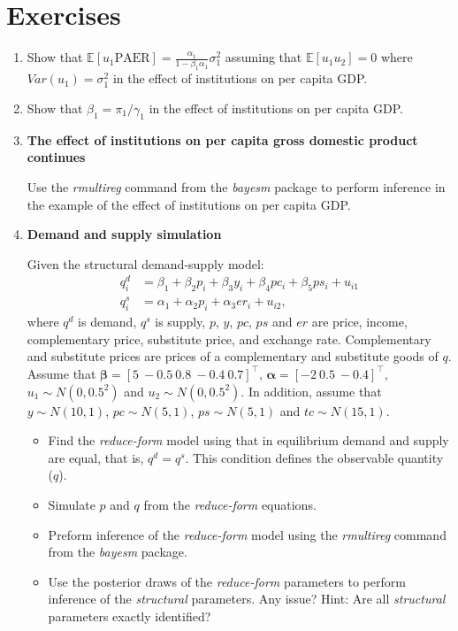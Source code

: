 \section{Exercises}\label{sec76}
\begin{enumerate}
	\item Show that $\mathbb{E}[u_1\text{PAER}]=\frac{\alpha_1}{1-\beta_1\alpha_1}\sigma^2_1$ assuming that $\mathbb{E}[u_1u_2]=0$ where $Var(u_1)=\sigma^2_1$ in the effect of institutions on per capita GDP.
	
	\item Show that $\beta_1=\pi_1/\gamma_1$ in the effect of institutions on per capita GDP.
	
	\item \textbf{The effect of institutions on per capita gross domestic product continues}
	
	Use the \textit{rmultireg} command from the \textit{bayesm} package to perform inference in the example of the effect of institutions on per capita GDP. 
	
	\item \textbf{Demand and supply simulation}
	
	Given the structural demand-supply model:
	\begin{align*}
		q_i^d&=\beta_1+\beta_2p_i+\beta_3y_i+\beta_4pc_i+\beta_5ps_i+u_{i1}\\
		q_i^s&=\alpha_1+\alpha_2p_i+\alpha_3er_i+u_{i2},
	\end{align*}
where $q^d$ is demand, $q^s$ is supply, $p$, $y$, $pc$, $ps$ and $er$ are price, income, complementary price, substitute price, and exchange rate. Complementary and substitute prices are prices of a complementary and substitute goods of $q$. Assume that $\bm{\beta}=\left[5 \ -0.5 \ 0.8 \ -0.4 \ 0.7\right]^{\top}$, $\bm{\alpha}=\left[-2 \ 0.5 \ -0.4\right]^{\top}$, $u_1\sim N(0, 0.5^2)$ and $u_2\sim N(0, 0.5^2)$. In addition, assume that $y\sim N(10,1)$, $pc\sim N(5,1)$, $ps\sim N(5,1)$ and $tc\sim N(15,1)$.
\begin{itemize}
	\item Find the \textit{reduce-form} model using that in equilibrium demand and supply are equal, that is, $q^d=q^s$. This condition defines the observable quantity ($q$).
	\item Simulate $p$ and $q$ from the \textit{reduce-form} equations.
	\item Preform inference of the \textit{reduce-form} model using the \textit{rmultireg} command from the \textit{bayesm} package.
	\item Use the posterior draws of the \textit{reduce-form} parameters to perform inference of the \textit{structural} parameters. Any issue? Hint: Are all \textit{structural} parameters exactly identified?   
\end{itemize}
	
	
\end{enumerate}


